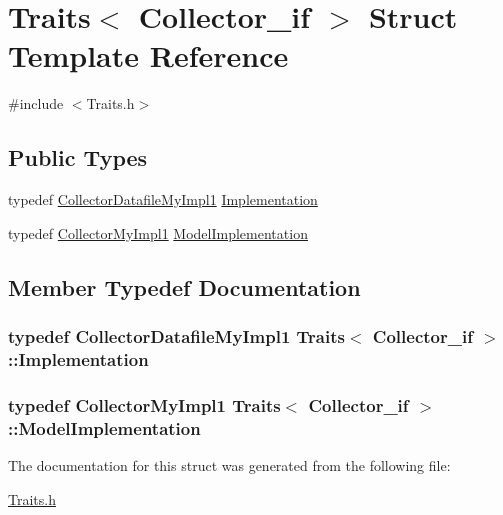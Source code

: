 \hypertarget{struct_traits_3_01_collector__if_01_4}{\section{Traits$<$ Collector\-\_\-if $>$ Struct Template Reference}
\label{struct_traits_3_01_collector__if_01_4}
}


{\ttfamily \#include $<$Traits.\-h$>$}

\subsection*{Public Types}
\begin{DoxyCompactItemize}
\item 
typedef \hyperlink{class_collector_datafile_my_impl1}{Collector\-Datafile\-My\-Impl1} \hyperlink{struct_traits_3_01_collector__if_01_4_a1d9580805be9a661541a69cbf3a947da}{Implementation}
\item 
typedef \hyperlink{class_collector_my_impl1}{Collector\-My\-Impl1} \hyperlink{struct_traits_3_01_collector__if_01_4_a38ef8e0ef3488a361965174720a895ae}{Model\-Implementation}
\end{DoxyCompactItemize}


\subsection{Member Typedef Documentation}
\hypertarget{struct_traits_3_01_collector__if_01_4_a1d9580805be9a661541a69cbf3a947da}{
\subsubsection[{Implementation}]{\setlength{\rightskip}{0pt plus 5cm}typedef {\bf Collector\-Datafile\-My\-Impl1} {\bf Traits}$<$ {\bf Collector\-\_\-if} $>$\-::{\bf Implementation}}}\label{struct_traits_3_01_collector__if_01_4_a1d9580805be9a661541a69cbf3a947da}
\hypertarget{struct_traits_3_01_collector__if_01_4_a38ef8e0ef3488a361965174720a895ae}{
\subsubsection[{Model\-Implementation}]{\setlength{\rightskip}{0pt plus 5cm}typedef {\bf Collector\-My\-Impl1} {\bf Traits}$<$ {\bf Collector\-\_\-if} $>$\-::{\bf Model\-Implementation}}}\label{struct_traits_3_01_collector__if_01_4_a38ef8e0ef3488a361965174720a895ae}


The documentation for this struct was generated from the following file\-:\begin{DoxyCompactItemize}
\item 
\hyperlink{_traits_8h}{Traits.\-h}\end{DoxyCompactItemize}
